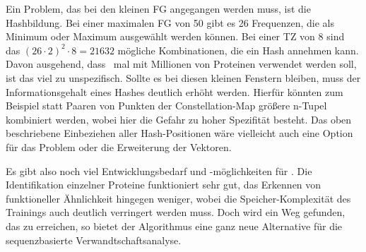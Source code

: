         Ein Problem, das bei den kleinen \ac{FG} angegangen werden muss, ist die Hashbildung. Bei einer maximalen \ac{FG} von 50 gibt es 26 Frequenzen, die als Minimum oder Maximum ausgewählt werden können. Bei einer \ac{TZ} von 8 sind das ${(26 \cdot 2)}^{2} \cdot 8 = 21632$ mögliche Kombinationen, die ein Hash annehmen kann. Davon ausgehend, dass \protfin\ mal mit Millionen von Proteinen verwendet werden soll, ist das viel zu unspezifisch. Sollte es bei diesen kleinen Fenstern bleiben, muss der Informationsgehalt eines Hashes deutlich erhöht werden. Hierfür könnten zum Beispiel statt Paaren von Punkten der Constellation-Map größere n-Tupel kombiniert werden, wobei hier die Gefahr zu hoher Spezifität besteht. Das oben beschriebene Einbeziehen aller Hash-Positionen wäre vielleicht auch eine Option für das Problem oder die Erweiterung der Vektoren.

        Es gibt also noch viel Entwicklungsbedarf und -möglichkeiten für \protfin. Die Identifikation einzelner Proteine funktioniert sehr gut, das Erkennen von funktioneller Ähnlichkeit hingegen weniger, wobei die Speicher-Komplexität des Trainings auch deutlich verringert werden muss. Doch wird ein Weg gefunden, das zu erreichen, so bietet der Algorithmus eine ganz neue Alternative für die sequenzbasierte Verwandtschaftsanalyse.

